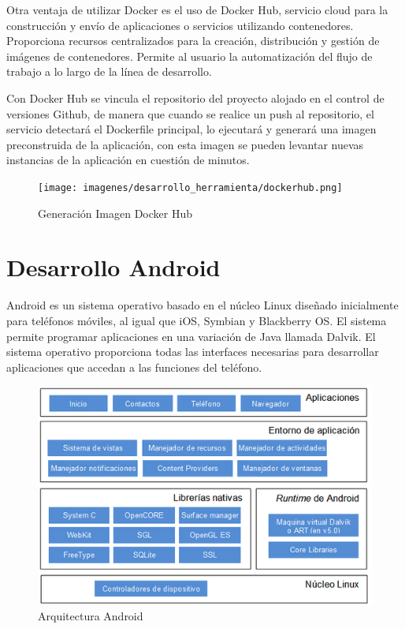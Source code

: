\documentclass[a4paper,11pt]{book}
\begin{document}
Otra ventaja de utilizar Docker es el uso de Docker Hub\cite{dkh}, servicio cloud para la construcción y envío de aplicaciones o servicios utilizando contenedores. Proporciona recursos centralizados para la creación, distribución y gestión de imágenes de contenedores. Permite al usuario la automatización del flujo de trabajo a lo largo de la línea de desarrollo.

Con Docker Hub se vincula el repositorio del proyecto alojado en el control de versiones Github, de manera que cuando se realice un push al repositorio, el servicio detectará el Dockerfile principal, lo ejecutará y generará una imagen preconstruida de la aplicación, con esta imagen se pueden levantar nuevas instancias de la aplicación en cuestión de minutos. 


\begin{figure}[H] 
\centering 
\texttt{[image: imagenes/desarrollo\_herramienta/dockerhub.png]}
\caption{ Generación Imagen Docker Hub\cite{dkh2}}
\end{figure}


\section{Desarrollo Android}

Android es un sistema operativo basado en el núcleo Linux diseñado inicialmente para teléfonos móviles, al igual que iOS, Symbian y Blackberry OS. El sistema permite programar aplicaciones en una variación de Java llamada Dalvik. El sistema operativo proporciona todas las interfaces necesarias para desarrollar aplicaciones que accedan a las funciones del teléfono. 

\begin{figure}[H] 
\centering 
\includegraphics[scale=0.5]{imagenes/desarrollo_herramienta/android.png}
\caption{ Arquitectura Android\cite{arqAndroid}}
\end{figure}
\end{document}
